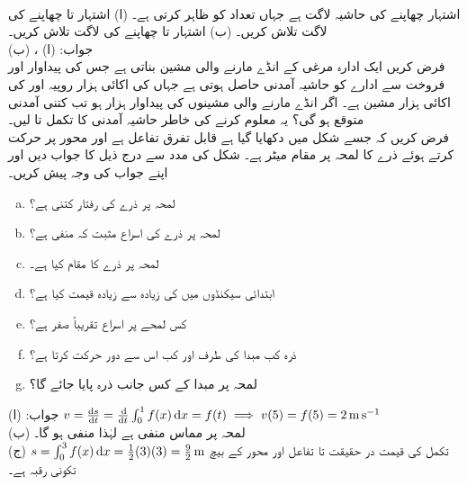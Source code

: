 \\
اشتہار چھاپنے کی حاشیہ لاگت  ہے جہاں  تعداد کو ظاہر کرتی ہے۔ (ا) اشتہار  تا  چھاپنے کی لاگت  تلاش کریں۔ (ب) اشتہار  تا  چھاپنے کی لاگت  تلاش کریں۔\\
جواب:\quad
(ا) ، (ب) 
\\
فرض کریں ایک ادارہ مرغی کے انڈے مارنے والی مشین بناتی ہے جس کی پیداوار اور فروخت سے ادارے کو  حاشیہ آمدنی حاصل ہوتی ہے جہاں  کی اکائی ہزار روپیہ اور  کی اکائی ہزار مشین ہے۔ اگر انڈے مارنے والی مشینوں کی پیداوار  ہزار ہو تب کتنی آمدنی متوقع ہو گی؟ یہ معلوم کرنے کی خاطر حاشیہ آمدنی کا تکمل  تا  لیں۔
\\
فرض کریں کہ  جسے شکل  میں دکھایا گیا ہے قابل تفرق تفاعل ہے اور محور پر حرکت کرتے ہوئے ذرے کا  لمحہ  پر مقام  میٹر ہے۔ شکل کی مدد سے درج ذیل کا جواب دیں اور اپنے جواب کی وجہ پیش کریں۔
\begin{enumerate}[a.]
\item
لمحہ  پر ذرے کی رفتار کتنی ہے؟
\item
لمحہ  پر ذرے کی اسراع مثبت کہ منفی ہے؟
\item
لمحہ  پر ذرے کا مقام کیا ہے۔
\item
ابتدائی  سیکنڈوں میں  کی زیادہ سے زیادہ قیمت کیا ہے؟
\item
کس لمحے پر اسراع تقریباً صفر ہے؟
\item
ذرہ کب مبدا کی طرف اور کب اس سے دور حرکت کرتا ہے؟
\item
لمحہ  پر مبدا کے کس جانب ذرہ پایا جائے گا؟ 
\end{enumerate}
جواب:\quad
(ا)
$v=\tfrac{\dif s}{\dif t}=\tfrac{\dif}{\dif t}\int_0^1f(x)\dif x=f(t)\implies v(5)=f(5)=\SI{2}{\meter\per\second}$\\
(ب) 
لمحہ  پر مماس منفی ہے لہٰذا  منفی ہو گا۔\\
(ج)
$s=\int_0^3f(x)\dif x=\tfrac{1}{2}(3)(3)=\tfrac{9}{2}\,\si{\meter}$\quad
تکمل کی قیمت در حقیقت  تا  تفاعل  اور محور کے بیچ تکونی رقبہ ہے۔\\
